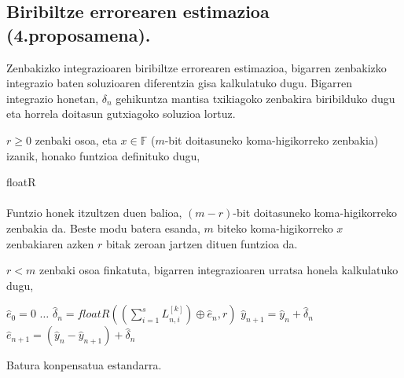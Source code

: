 \subsection{Biribiltze errorearen estimazioa (4.proposamena).}

Zenbakizko integrazioaren biribiltze errorearen estimazioa, bigarren zenbakizko integrazio baten soluzioaren diferentzia gisa kalkulatuko dugu. Bigarren integrazio honetan, $\delta_{n}$ gehikuntza mantisa txikiagoko zenbakira biribilduko dugu eta  horrela doitasun gutxiagoko soluzioa lortuz. 

$r\ge0$ zenbaki osoa, eta $x \in \mathbb{F}$ ($m$-bit doitasuneko koma-higikorreko zenbakia) izanik, honako funtzioa definituko dugu,

\begin{algorithm}[H]
  \SetAlgoLined\DontPrintSemicolon
  \caption{floatR}
\end{algorithm} 

\paragraph*{}Funtzio honek itzultzen duen balioa, $(m-r)$-bit doitasuneko koma-higikorreko zenbakia da. Beste modu batera esanda, $m$ biteko koma-higikorreko $x$ zenbakiaren azken $r$ bitak zeroan jartzen dituen funtzioa da.

 $r<m$ zenbaki osoa finkatuta, bigarren integrazioaren urratsa honela kalkulatuko dugu,



\begin{algorithm}[h]
\label{alg:71}
 \BlankLine
  $\hat{e}_{0}=0$\;
  \BlankLine
  {
   $\dots$\;
   \BlankLine
    $\hat{\delta}_{n}= floatR((\sum\limits_{i=1}^{s} L_{n,i}^{[k]}) \oplus \hat{e}_{n},r) $\;
    $\hat{y}_{n+1}=\hat{y}_{n} + \hat{\delta}_n$\;
    $\hat{e}_{n+1}=(\hat{y}_{n} -\hat{y}_{n+1})+ \hat{\delta}_n$\;            
   \BlankLine
 }
 \caption{Batura konpensatua estandarra.}
\end{algorithm}

